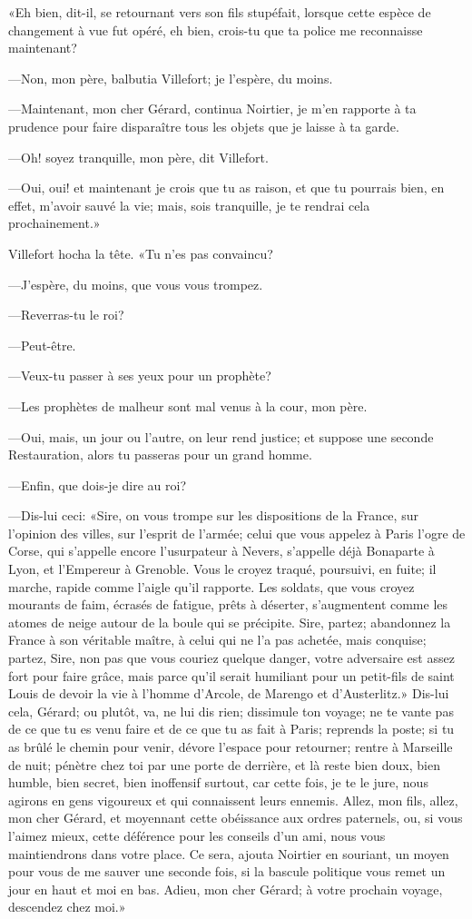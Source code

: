 «Eh bien, dit-il, se retournant vers son fils stupéfait, lorsque cette espèce de changement à vue fut opéré, eh bien, crois-tu que ta police me reconnaisse maintenant?

—Non, mon père, balbutia Villefort; je l'espère, du moins.

—Maintenant, mon cher Gérard, continua Noirtier, je m'en rapporte à ta prudence pour faire disparaître tous les objets que je laisse à ta garde.

—Oh! soyez tranquille, mon père, dit Villefort.

—Oui, oui! et maintenant je crois que tu as raison, et que tu pourrais bien, en effet, m'avoir sauvé la vie; mais, sois tranquille, je te rendrai cela prochainement.»

Villefort hocha la tête. «Tu n'es pas convaincu?

—J'espère, du moins, que vous vous trompez.

—Reverras-tu le roi?

—Peut-être.

—Veux-tu passer à ses yeux pour un prophète?

—Les prophètes de malheur sont mal venus à la cour, mon père.

—Oui, mais, un jour ou l'autre, on leur rend justice; et suppose une seconde Restauration, alors tu passeras pour un grand homme.

—Enfin, que dois-je dire au roi?

—Dis-lui ceci: «Sire, on vous trompe sur les dispositions de la France, sur l'opinion des villes, sur l'esprit de l'armée; celui que vous appelez à Paris l'ogre de Corse, qui s'appelle encore l'usurpateur à Nevers, s'appelle déjà Bonaparte à Lyon, et l'Empereur à Grenoble. Vous le croyez traqué, poursuivi, en fuite; il marche, rapide comme l'aigle qu'il rapporte. Les soldats, que vous croyez mourants de faim, écrasés de fatigue, prêts à déserter, s'augmentent comme les atomes de neige autour de la boule qui se précipite. Sire, partez; abandonnez la France à son véritable maître, à celui qui ne l'a pas achetée, mais conquise; partez, Sire, non pas que vous couriez quelque danger, votre adversaire est assez fort pour faire grâce, mais parce qu'il serait humiliant pour un petit-fils de saint Louis de devoir la vie à l'homme d'Arcole, de Marengo et d'Austerlitz.» Dis-lui cela, Gérard; ou plutôt, va, ne lui dis rien; dissimule ton voyage; ne te vante pas de ce que tu es venu faire et de ce que tu as fait à Paris; reprends la poste; si tu as brûlé le chemin pour venir, dévore l'espace pour retourner; rentre à Marseille de nuit; pénètre chez toi par une porte de derrière, et là reste bien doux, bien humble, bien secret, bien inoffensif surtout, car cette fois, je te le jure, nous agirons en gens vigoureux et qui connaissent leurs ennemis. Allez, mon fils, allez, mon cher Gérard, et moyennant cette obéissance aux ordres paternels, ou, si vous l'aimez mieux, cette déférence pour les conseils d'un ami, nous vous maintiendrons dans votre place. Ce sera, ajouta Noirtier en souriant, un moyen pour vous de me sauver une seconde fois, si la bascule politique vous remet un jour en haut et moi en bas. Adieu, mon cher Gérard; à votre prochain voyage, descendez chez moi.»

